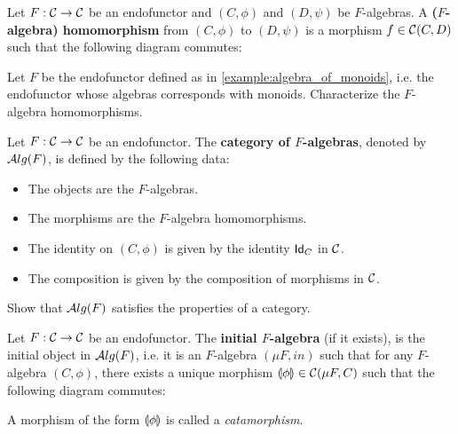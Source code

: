 \begin{dfn} Let $F:\CC\to \CC$ be an endofunctor and $(C,\phi)$ and $(D,\psi)$ be $F$-algebras. A \textbf{($F$-algebra) homomorphism} from $(C,\phi)$ to $(D,\psi)$ is a morphism $f\in \CHom{\CC}{C}{D}$ such that the following diagram commutes:
\begin{center}
\end{center}
\end{dfn}


\begin{exer} Let $F$ be the endofunctor defined as in \cref{example:algebra_of_monoids}, i.e. the endofunctor whose algebras corresponds with monoids. Characterize the $F$-algebra homomorphisms.
\end{exer}

\begin{dfn}\label{definition:category_of_Falgebras} Let $F:\CC\to \CC$ be an endofunctor. The \textbf{category of $F$-algebras}, denoted by $\ALG{F}$, is defined by the following data:
\begin{itemize}
\item The objects are the $F$-algebras.
\item The morphisms are the $F$-algebra homomorphisms.
\item The identity on $(C,\phi)$ is given by the identity $\Id[C]$ in $\CC$.
\item The composition is given by the composition of morphisms in $\CC$.
\end{itemize}
\end{dfn}

\begin{exer} Show that $\ALG{F}$ satisfies the properties of a category.
\end{exer}

\begin{dfn} Let $F:\CC\to\CC$ be an endofunctor. The \textbf{initial $F$-algebra} (if it exists), is the initial object in $\ALG{F}$, i.e. it is an $F$-algebra $(\mu F, in)$ such that for any $F$-algebra $(C,\phi)$, there exists a unique morphism $\catam{\phi} \in \CHom{\CC}{\mu F}{C}$ such that the following diagram commutes:
\begin{center}
\end{center}
A morphism of the form $\catam{\phi}$ is called a \textit{catamorphism}.
\end{dfn}

